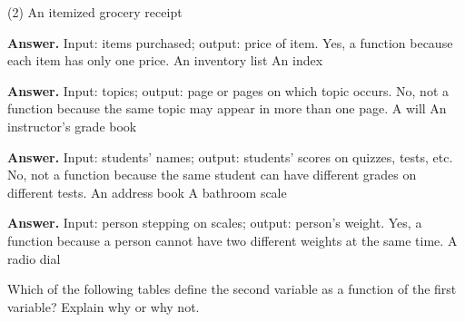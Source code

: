 \documentclass[10pt,]{book}
\theoremstyle{plain}
\theoremstyle{definition}
\theoremstyle{definition}
\theoremstyle{definition}
\begin{document}
\begin{exercisegroup}(2)
\exercise[7.]\hypertarget{exercise-17}{}An itemized grocery receipt%
\par\smallskip
\noindent\textbf{Answer.}\hypertarget{answer-14}{}\quad
Input: items purchased; output: price of item. Yes, a function because each item has only one price.%
\exercise[8.]\hypertarget{exercise-18}{}An inventory list%
\exercise[9.]\hypertarget{exercise-19}{}An index%
\par\smallskip
\noindent\textbf{Answer.}\hypertarget{answer-15}{}\quad
Input: topics; output: page or pages on which topic occurs. No, not a function because the same topic may appear in more than one page.%
\exercise[10.]\hypertarget{exercise-20}{}A will%
\exercise[11.]\hypertarget{exercise-21}{}An instructor's grade book%
\par\smallskip
\noindent\textbf{Answer.}\hypertarget{answer-16}{}\quad
Input: students’ names; output: students’ scores on quizzes, tests, etc. No, not a function because the same student can have different grades on different tests.%
\exercise[12.]\hypertarget{exercise-22}{}An address book%
\exercise[13.]\hypertarget{exercise-23}{}A bathroom scale%
\par\smallskip
\noindent\textbf{Answer.}\hypertarget{answer-17}{}\quad
Input: person stepping on scales; output: person's weight. Yes, a function because a person cannot have two different weights at the same time.%
\exercise[14.]\hypertarget{exercise-24}{}A radio dial%
\end{exercisegroup}
\par\smallskip\noindent
\hypertarget{exercisegroup-3}{}\par\noindent Which of the following tables define the second variable as a function of the first variable? Explain why or why not.%
\end{document}
